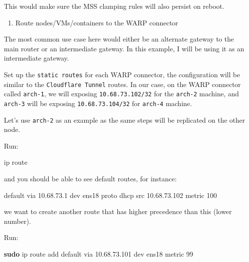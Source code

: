 \documentclass[
]{article}
\newenvironment{Shaded}{\begin{snugshade}}{\end{snugshade}}
\newcommand{\ExtensionTok}[1]{#1}
\newcommand{\FunctionTok}[1]{\textcolor[rgb]{0.13,0.29,0.53}{\textbf{#1}}}
\newcommand{\NormalTok}[1]{#1}
\providecommand{\tightlist}{%
  \setlength{\itemsep}{0pt}\setlength{\parskip}{0pt}}\usepackage{longtable,booktabs,array}
\begin{document}
This would make sure the MSS clamping rules will also persist on reboot.

\newpage{}

\begin{enumerate}
\def\labelenumi{\arabic{enumi}.}
\setcounter{enumi}{5}
\tightlist
\item
  Route nodes/VMs/containers to the WARP connector
\end{enumerate}

The most common use case here would either be an alternate gateway to
the main router or an intermediate gateway. In this example, I will be
using it as an intermediate gateway.

Set up the \texttt{static\ routes} for each WARP connector, the
configuration will be similar to the \texttt{Cloudflare\ Tunnel} routes.
In our case, on the WARP connector called \texttt{arch-1}, we will
exposing \texttt{10.68.73.102/32} for the \texttt{arch-2} machine, and
\texttt{arch-3} will be exposing \texttt{10.68.73.104/32} for
\texttt{arch-4} machine.

Let's use \texttt{arch-2} as an example as the same steps will be
replicated on the other node.

Run:

\begin{Shaded}
\begin{Highlighting}[numbers=left,,]
\ExtensionTok{ip}\NormalTok{ route}
\end{Highlighting}
\end{Shaded}

and you should be able to see default routes, for instance:

\begin{Shaded}
\begin{Highlighting}[numbers=left,,]
\ExtensionTok{default}\NormalTok{ via 10.68.73.1 dev ens18 proto dhcp src 10.68.73.102 metric 100}
\end{Highlighting}
\end{Shaded}

we want to create another route that has higher precedence than this
(lower number).

Run:

\begin{Shaded}
\begin{Highlighting}[numbers=left,,]
\FunctionTok{sudo}\NormalTok{ ip route add default via 10.68.73.101 dev ens18 metric 99}
\end{Highlighting}
\end{Shaded}
\end{document}
